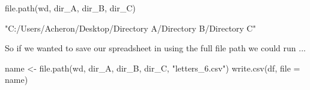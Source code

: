 \begin{inR}
file.path(wd, dir_A, dir_B, dir_C)
\end{inR}

\begin{outR}
"C:/Users/Acheron/Desktop/Directory A/Directory B/Directory C" 
\end{outR}

\noindent
So if we wanted to save our spreadsheet in  using the full file path we could run ...

\begin{inR}
name <- file.path(wd, dir_A, dir_B, dir_C, "letters_6.csv")
write.csv(df, file = name)
\end{inR}

\vspace{2em}

